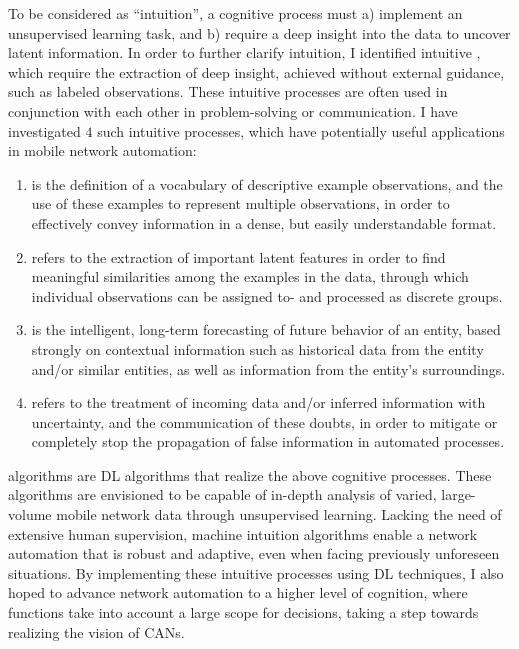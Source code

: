 		To be considered as ``intuition'', a cognitive process must a) implement an unsupervised learning task, and b) require a deep insight into the data to uncover latent information.
		In order to further clarify intuition, I identified intuitive , which require the extraction of deep insight, achieved without external guidance, such as labeled observations.
		These intuitive processes are often used in conjunction with each other in problem-solving or communication.
		I have investigated $4$ such intuitive processes, which have potentially useful applications in mobile network automation:
		\begin{enumerate}[label=\textbf{\alph*})]
			\item
				 is the definition of a vocabulary of descriptive example observations, and the use of these examples to represent multiple observations, in order to effectively convey information in a dense, but easily understandable format.
			
			\item
				 refers to the extraction of important latent features in order to find meaningful similarities among the examples in the data, through which individual observations can be assigned to- and processed as discrete groups.
			
			\item
				 is the intelligent, long-term forecasting of future behavior of an entity, based strongly on contextual information such as historical data from the entity and/or similar entities, as well as information from the entity's surroundings.
			
			\item
				 refers to the treatment of incoming data and/or inferred information with uncertainty, and the communication of these doubts, in order to mitigate or completely stop the propagation of false information in automated processes.
		\end{enumerate}
		
		 algorithms are \ac{DL} algorithms that realize the above cognitive processes.
		These algorithms are envisioned to be capable of in-depth analysis of varied, large-volume mobile network data through unsupervised learning.
		Lacking the need of extensive human supervision, machine intuition algorithms enable a network automation that is robust and adaptive, even when facing previously unforeseen situations.		
		By implementing these intuitive processes using \ac{DL} techniques, I also hoped to advance network automation to a higher level of cognition, where functions take into account a large scope for decisions, taking a step towards realizing the vision of \acp{CAN}.
			
